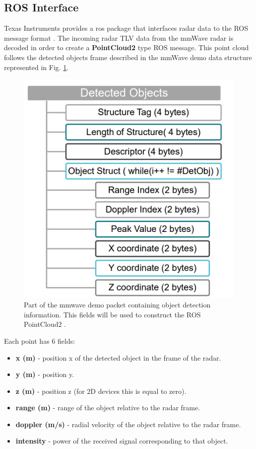 \subsection{ROS Interface}
Texas Instruments provides a ros package that interfaces radar data to the ROS message format \cite{tisetup}. The incoming radar TLV data from the mmWave radar is decoded in order to create a  \textbf{PointCloud2} type ROS message.
This point cloud follows the detected objects frame described in the mmWave demo data structure \cite{mmdata} represented in Fig. \ref{fig:demodata}.
\begin{figure}[!htb]
    \centering
    \includegraphics[scale=0.6]{imgs/chapter4/demodata.png}
    \caption[Part of the mmwave demo packet]{Part of the mmwave demo packet containing object detection information. This fields will be used to construct the ROS PointCloud2 \cite{mmdata}.}
    \label{fig:demodata}
\end{figure}
Each point has 6 fields:
\begin{itemize}
\item \textbf{x (m)} - position x of the detected  object in the frame of the radar.
\item \textbf{y (m)} - position y.
\item \textbf{z (m)} - position z (for 2D devices this is equal to zero).
\item \textbf{range (m)} - range of the object relative to the radar frame.
\item \textbf{doppler (m/s)} - radial velocity of the object relative to the radar frame.
\item \textbf{intensity} - power of the received signal corresponding to that object.
\end{itemize}

